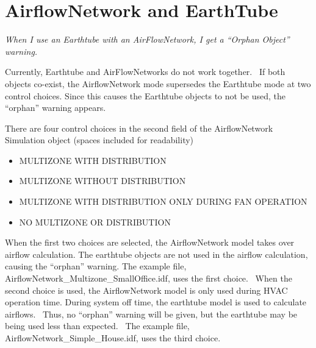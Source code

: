 \section{AirflowNetwork and EarthTube}\label{airflownetwork-and-earthtube}

\emph{When I use an Earthtube with an AirFlowNetwork, I get a ``Orphan Object'' warning.}

Currently, Earthtube and AirFlowNetworks do not work together.~ If both objects co-exist, the AirflowNetwork mode supersedes the Earthtube mode at two control choices. Since this causes the Earthtube objects to not be used, the ``orphan'' warning appears.

There are four control choices in the second field of the AirflowNetwork Simulation object (spaces included for readability)

\begin{itemize}
\item
  MULTIZONE WITH DISTRIBUTION
\item
  MULTIZONE WITHOUT DISTRIBUTION
\item
  MULTIZONE WITH DISTRIBUTION ONLY DURING FAN OPERATION
\item
  NO MULTIZONE OR DISTRIBUTION
\end{itemize}

When the first two choices are selected, the AirflowNetwork model takes over airflow calculation. The earthtube objects are not used in the airflow calculation, causing the ``orphan'' warning. The example file, AirflowNetwork\_Multizone\_SmallOffice.idf, uses the first choice.~ When the second choice is used, the AirflowNetwork model is only used during HVAC operation time. During system off time, the earthtube model is used to calculate airflows.~ Thus, no ``orphan'' warning will be given, but the earthtube may be being used less than expected.~ The example file, AirflowNetwork\_Simple\_House.idf, uses the third choice.

